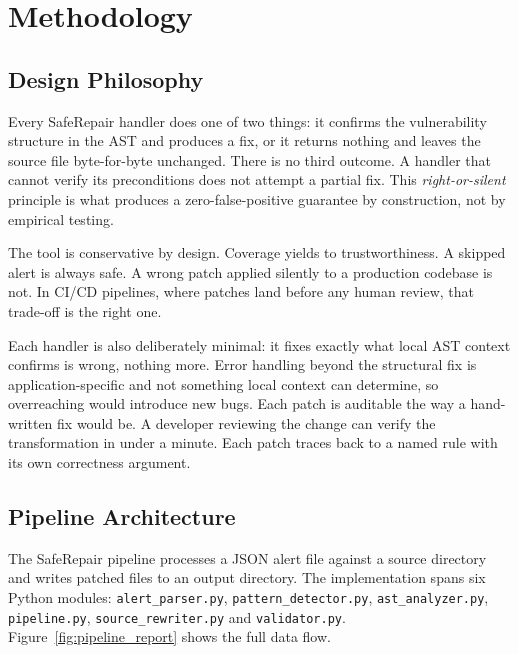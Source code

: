 \chapter{Methodology}
\label{chap:methodology}

\section{Design Philosophy}
\label{sec:right_or_silent}

Every SafeRepair handler does one of two things: it confirms the vulnerability structure in the AST and produces a fix, or it returns nothing and leaves the source file byte-for-byte unchanged. There is no third outcome. A handler that cannot verify its preconditions does not attempt a partial fix. This \textit{right-or-silent} principle is what produces a zero-false-positive guarantee by construction, not by empirical testing.

The tool is conservative by design. Coverage yields to trustworthiness. A skipped alert is always safe. A wrong patch applied silently to a production codebase is not. In CI/CD pipelines, where patches land before any human review, that trade-off is the right one.

Each handler is also deliberately minimal: it fixes exactly what local AST context confirms is wrong, nothing more. Error handling beyond the structural fix is application-specific and not something local context can determine, so overreaching would introduce new bugs. Each patch is auditable the way a hand-written fix would be. A developer reviewing the change can verify the transformation in under a minute. Each patch traces back to a named rule with its own correctness argument.

\section{Pipeline Architecture}
\label{sec:arch}

The SafeRepair pipeline processes a JSON alert file against a source directory and writes patched files to an output directory. The implementation spans six Python modules: \texttt{alert\_parser.py}, \texttt{pattern\_detector.py}, \texttt{ast\_analyzer.py}, \texttt{pipeline.py}, \texttt{source\_rewriter.py} and \texttt{vali\-dator.py}. Figure~\ref{fig:pipeline_report} shows the full data flow.

